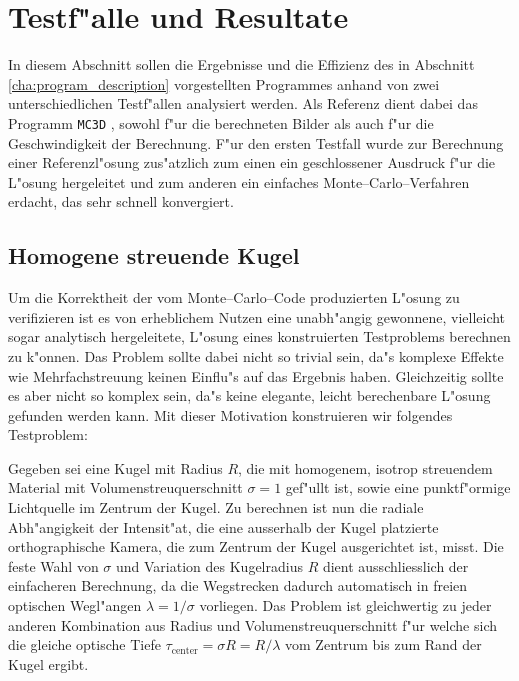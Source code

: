 	\chapter{Testf"alle und Resultate}
	In diesem Abschnitt sollen die Ergebnisse und die Effizienz des in Abschnitt \ref{cha:program_description} vorgestellten Programmes anhand von zwei unterschiedlichen Testf"allen analysiert werden. Als Referenz dient dabei das Programm \texttt{MC3D} \citep{Wolf:2003p12974}, sowohl f"ur die berechneten Bilder als auch f"ur die Geschwindigkeit der Berechnung. F"ur den ersten Testfall wurde zur Berechnung einer Referenzl"osung zus"atzlich zum einen ein geschlossener Ausdruck f"ur die L"osung hergeleitet und zum anderen ein einfaches Monte--Carlo--Verfahren erdacht, das sehr schnell konvergiert.
	
	\section{Homogene streuende Kugel}
	Um die Korrektheit der vom Monte--Carlo--Code produzierten L"osung zu verifizieren ist es von erheblichem Nutzen eine unabh"angig gewonnene, vielleicht sogar analytisch hergeleitete, L"osung eines konstruierten Testproblems berechnen zu k"onnen. Das Problem sollte dabei nicht so trivial sein, da"s komplexe Effekte wie Mehrfachstreuung keinen Einflu"s auf das Ergebnis haben. Gleichzeitig sollte es aber nicht so komplex sein, da"s keine elegante, leicht berechenbare L"osung gefunden werden kann.
	Mit dieser Motivation konstruieren wir folgendes Testproblem:
		
	Gegeben sei eine Kugel mit Radius $R$, die mit homogenem, isotrop streuendem Material mit Volumenstreuquerschnitt $\sigma=1$ gef"ullt ist, sowie eine punktf"ormige Lichtquelle im Zentrum der Kugel. Zu berechnen ist nun die radiale Abh"angigkeit der Intensit"at, die eine ausserhalb der Kugel platzierte orthographische Kamera, die zum Zentrum der Kugel ausgerichtet ist, misst. Die feste Wahl von $\sigma$ und Variation des Kugelradius $R$ dient ausschliesslich der einfacheren Berechnung, da die Wegstrecken dadurch automatisch in freien optischen  Wegl"angen $\lambda=1/\sigma$ vorliegen. Das Problem ist gleichwertig zu jeder anderen Kombination aus Radius und Volumenstreuquerschnitt f"ur welche sich die gleiche optische Tiefe $\tau_\text{center}=\sigma R=R/\lambda$ vom Zentrum bis zum Rand der Kugel ergibt.
	
